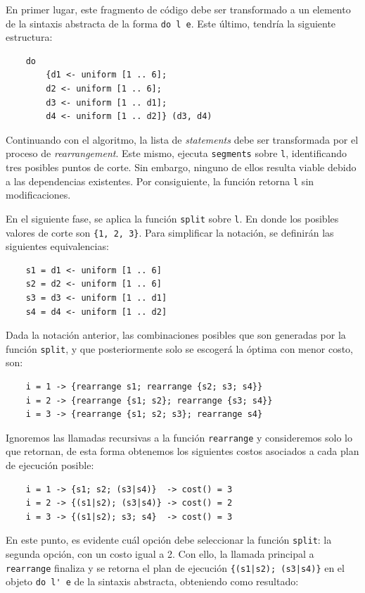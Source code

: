 En primer lugar, este fragmento de código debe ser transformado a un elemento de la sintaxis abstracta de la forma \verb|do l e|. Este último, tendría la siguiente estructura:

\begin{verbatim}
    do
        {d1 <- uniform [1 .. 6];
        d2 <- uniform [1 .. 6];
        d3 <- uniform [1 .. d1];
        d4 <- uniform [1 .. d2]} (d3, d4)
\end{verbatim}

Continuando con el algoritmo, la lista de \textit{statements} debe ser transformada por el proceso de \textit{rearrangement}. Este mismo, ejecuta \verb|segments| sobre \verb|l|, identificando tres posibles puntos de corte. Sin embargo, ninguno de ellos resulta viable debido a las dependencias existentes. Por consiguiente, la función retorna \verb|l| sin modificaciones.

En el siguiente fase, se aplica la función \verb|split| sobre \verb|l|. En donde los posibles valores de corte son \verb|{1, 2, 3}|. Para simplificar la notación, se definirán las siguientes equivalencias: 

\begin{verbatim}
    s1 = d1 <- uniform [1 .. 6]
    s2 = d2 <- uniform [1 .. 6]
    s3 = d3 <- uniform [1 .. d1]
    s4 = d4 <- uniform [1 .. d2]
\end{verbatim}

Dada la notación anterior, las combinaciones posibles que son generadas por la función \verb|split|, y que posteriormente solo se escogerá la óptima con menor costo, son:

\begin{verbatim}
    i = 1 -> {rearrange s1; rearrange {s2; s3; s4}}
    i = 2 -> {rearrange {s1; s2}; rearrange {s3; s4}}
    i = 3 -> {rearrange {s1; s2; s3}; rearrange s4}
\end{verbatim}

Ignoremos las llamadas recursivas a la función \verb|rearrange| y consideremos solo lo que retornan, de esta forma obtenemos los siguientes costos asociados a cada plan de ejecución posible:

\begin{verbatim}
    i = 1 -> {s1; s2; (s3|s4)}  -> cost() = 3
    i = 2 -> {(s1|s2); (s3|s4)} -> cost() = 2
    i = 3 -> {(s1|s2); s3; s4}  -> cost() = 3
\end{verbatim}

En este punto, es evidente cuál opción debe seleccionar la función \verb|split|: la segunda opción, con un costo igual a 2. Con ello, la llamada principal a \verb|rearrange| finaliza y se retorna el plan de ejecución \verb!{(s1|s2); (s3|s4)}! en el objeto \verb|do l' e| de la sintaxis abstracta, obteniendo como resultado:

